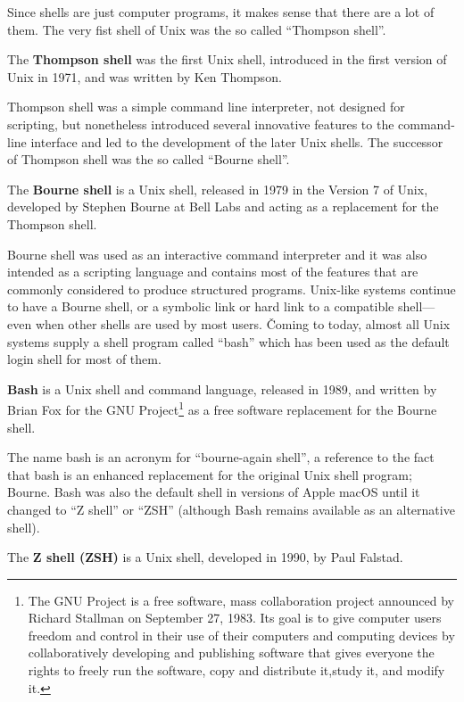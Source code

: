 Since shells are just computer programs, it makes sense that there are a lot of them. The very fist shell of Unix was
the so called ``Thompson shell''.

The \textbf{Thompson shell} was the first Unix shell, introduced in the first version of Unix in 1971, and was written
by Ken Thompson.
\ed

Thompson shell was a simple command line interpreter, not designed for scripting, but nonetheless introduced several
innovative features to the command-line interface and led to the development of the later Unix shells. The successor of
Thompson shell was the so called ``Bourne shell''.

The \textbf{Bourne shell} is a Unix shell, released in 1979 in the Version 7 of Unix, developed by Stephen Bourne at
Bell Labs and acting as a replacement for the Thompson shell.
\ed

Bourne shell was used as an interactive command interpreter and it was also intended as a scripting language and
contains most of the features that are commonly considered to produce structured programs. Unix-like systems continue
to have a Bourne shell, or a symbolic link or hard link to a compatible shell—even when other shells are used by
most users. \v

Coming to today, almost all Unix systems supply a shell program called ``bash'' which has been used as the default login
shell for most of them.

\bd[Bash]
\textbf{Bash} is a Unix shell and command language, released in 1989, and written by Brian Fox for the GNU
Project\footnote{The GNU Project is a free software, mass collaboration project announced by Richard Stallman on
September 27, 1983. Its goal is to give computer users freedom and control in their use of their computers and computing
devices by collaboratively developing and publishing software that gives everyone the rights to freely run the software,
copy and distribute it,study it, and modify it.} as a free software replacement for the Bourne shell.
\ed

The name bash is an acronym for ``bourne-again shell'', a reference to the fact that bash is an enhanced replacement
for the original Unix shell program; Bourne. Bash was also the default shell in versions of Apple macOS until it
changed to ``Z shell'' or ``ZSH'' (although Bash remains available as an alternative shell).

The \textbf{Z shell (ZSH)} is a Unix shell, developed in 1990, by Paul Falstad.
\ed


